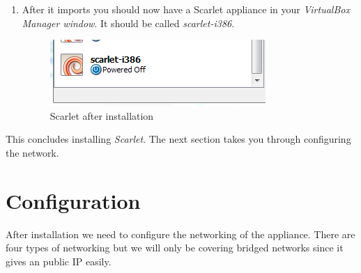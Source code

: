 \documentclass[pdftex,11pt,letterpaper]{article}
\begin{document}
\begin{enumerate}
\item After it imports you should now have a Scarlet appliance in your \textit{VirtualBox Manager window}.  It should be called \textit{scarlet-i386}.

    \begin{figure}[H]
        \begin{center}
        \leavevmode
            \includegraphics[]{scarlet_images/scarlet_finished_importing.png}
        \end{center}
        \caption{Scarlet after installation}
        \label{fig:scarlet_finished_importing}
    \end{figure}

\end{enumerate}

This concludes installing \textit{Scarlet}. The next section takes you through configuring the network.

\section{Configuration}
\label{sec:configuration}

After installation we need to configure the networking of the appliance.  There are four types of networking but we will only be covering bridged networks since it gives an public IP easily.
\end{document}
